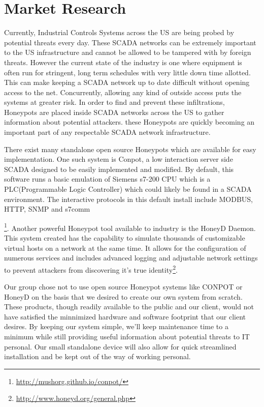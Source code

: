 \chapter{Market Research}

Currently, Industrial Controls Systems across the US are being probed by potential threats every day. These SCADA networks can be extremely important to the US infrastructure and cannot be allowed to be tampered with by foreign threats. However the current state of the industry is one where equipment is often run for stringent, long term schedules with very little down time allotted. This can make keeping a SCADA network up to date difficult without opening access to the net. Concurrently, allowing any kind of outside access puts the systems at greater risk. In order to find and prevent these infiltrations, Honeypots are placed inside SCADA networks across the US to gather information about potential attackers. these Honeypots are quickly becoming an important part of any respectable SCADA network infrastructure. 


There exist many standalone open source Honeypots which are available for easy implementation. One such system is Conpot, a low interaction server side SCADA designed to be easily implemented and modified. By default, this software runs a basic emulation of Siemens s7-200 CPU which is a PLC(Programmable Logic Controller) which could likely be found in a SCADA environment. The interactive protocols in this default install include MODBUS, HTTP, SNMP and s7comm\addtocounter{footnote}{11}\footnote{\url{http://mushorg.github.io/conpot/}}. Another powerful Honeypot tool available to industry is the HoneyD Daemon. This system created has the capability to simulate thousands of customizable virtual hosts on a network at the same time. It allows for the configuration of numerous services and includes advanced logging and adjustable network settings to prevent attackers from discovering it's true identity\footnote{\url{http://www.honeyd.org/general.php}}.


Our group chose not to use open source Honeypot systems like CONPOT  or HoneyD on the basis that we desired to create our own system from scratch. These products, though readily available to the public and our client, would not have satisfied the minnimized hardware and software footprint that our client desires. By keeping our system simple, we’ll keep maintenance time to a minimum while still providing useful information about potential threats to IT personal. Our small standalone device will also allow for quick streamlined installation and be kept out of the way of working personal. 
